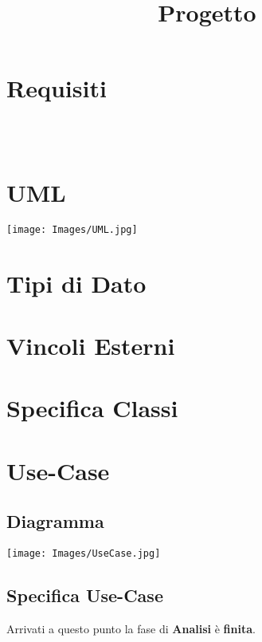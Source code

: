 \documentclass[12pt, letterpaper]{article}
\title{\textbf{Progetto}}
\date{}
\begin{document}
\maketitle

\tableofcontents 
\newpage
\section{Requisiti}
\begin{verbatim}
  


\end{verbatim}
\newpage\section{UML}
\begin{center}
    \texttt{[image: Images/UML.jpg]}
\end{center} 
\newpage
\section{Tipi di Dato}


\section{Vincoli Esterni}

\newpage
\section{Specifica Classi}

\section{Use-Case}
\subsection{Diagramma}
\begin{center}
    \texttt{[image: Images/UseCase.jpg]}
\end{center} 
\newpage
\subsection{Specifica Use-Case}

    



\newpage
Arrivati a questo punto la fase di \textbf{Analisi} è \textbf{finita}.
\end{document}
